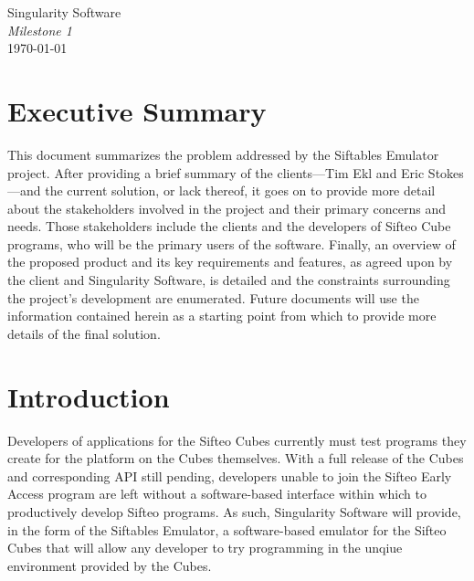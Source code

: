 \documentclass[12pt]{article}
\begin{document}
\vspace*{\fill}
        \begin{center}
                \LARGE{Singularity Software} \\
                \LARGE{\textit{Milestone 1}} \\
                \vspace{.15in}
                \large{\today} \\
        \end{center}
\vspace*{\fill}
\thispagestyle{empty}

\clearpage

\tableofcontents

\clearpage
        
\section{Executive Summary}
This document summarizes the problem addressed by the Siftables Emulator project. After providing a brief summary of the clients---Tim Ekl and Eric Stokes---and the current solution, or lack thereof, it goes on to provide more detail about the stakeholders involved in the project and their primary concerns and needs. Those stakeholders include the clients and the developers of Sifteo Cube programs, who will be the primary users of the software. Finally, an overview of the proposed product and its key requirements and features, as agreed upon by the client and Singularity Software, is detailed and the constraints surrounding the project's development are enumerated. Future documents will use the information contained herein as a starting point from which to provide more details of the final solution.

\section{Introduction}
Developers of applications for the \gls{Sifteo Cubes} currently must test programs they create for the platform on the Cubes themselves.  With a full release of the Cubes and corresponding \gls{API} still pending, developers unable to join the Sifteo Early Access program are left without a software-based interface within which to productively develop Sifteo programs. As such, Singularity Software will provide, in the form of the Siftables Emulator, a software-based emulator for the Sifteo Cubes that will allow any developer to try programming in the unqiue environment provided by the Cubes.
\end{document}
